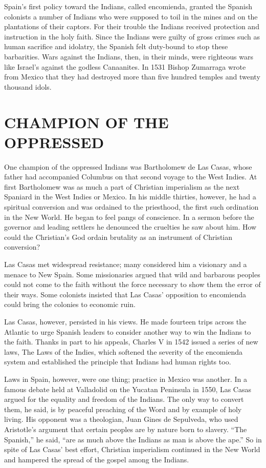 Spain’s first policy toward the Indians, called encomienda, granted the Spanish colonists a number
of Indians who were supposed to toil in the mines and on the plantations of their captors. For their
trouble the Indians received protection and instruction in the holy faith. Since the Indians were
guilty of gross crimes such as human sacrifice and idolatry, the Spanish felt duty-bound to stop
these barbarities. Wars against the Indians, then, in their minds, were righteous wars like Israel’s
against the godless Canaanites. In 1531 Bishop Zumarraga wrote from Mexico that they had destroyed
more than five hundred temples and twenty thousand idols.

\section{CHAMPION OF THE OPPRESSED}

One champion of the oppressed Indians was Bartholomew de Las Casas, whose father had accompanied
Columbus on that second voyage to the West Indies. At first Bartholomew was as much a part of
Christian imperialism as the next Spaniard in the West Indies or Mexico. In his middle thirties,
however, he had a spiritual conversion and was ordained to the priesthood, the first such ordination
in the New World. He began to feel pangs of conscience. In a sermon before the governor and leading
settlers he denounced the cruelties he saw about him. How could the Christian’s God ordain brutality
as an instrument of Christian conversion?

Las Casas met widespread resistance; many considered him a visionary and a menace to New Spain. Some
missionaries argued that wild and barbarous peoples could not come to the faith without the force
necessary to show them the error of their ways. Some colonists insisted that Las Casas’ opposition
to encomienda could bring the colonies to economic ruin.

Las Casas, however, persisted in his views. He made fourteen trips across the Atlantic to urge
Spanish leaders to consider another way to win the Indians to the faith. Thanks in part to his
appeals, Charles V in 1542 issued a series of new laws, The Laws of the Indies, which softened the
severity of the encomienda system and established the principle that Indians had human rights too.

Laws in Spain, however, were one thing; practice in Mexico was another. In a famous debate held at
Valladolid on the Yucatan Peninsula in 1550, Las Casas argued for the equality and freedom of the
Indians. The only way to convert them, he said, is by peaceful preaching of the Word and by example
of holy living. His opponent was a theologian, Juan Gines de Sepulveda, who used Aristotle’s
argument that certain peoples are by nature born to slavery. “The Spanish,” he said, “are as much
above the Indians as man is above the ape.” So in spite of Las Casas’ best effort, Christian
imperialism continued in the New World and hampered the spread of the gospel among the Indians.

